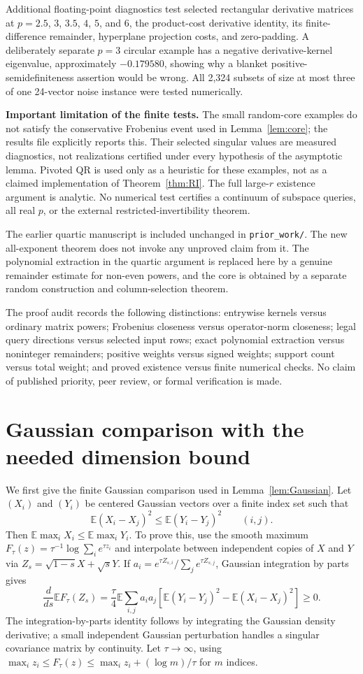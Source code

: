 \documentclass[11pt,letterpaper]{article}
\theoremstyle{definition}
\theoremstyle{remark}
\numberwithin{equation}{section}
\newcommand{\E}{\mathbb E}
\begin{document}
Additional floating-point diagnostics test selected rectangular derivative matrices at $p=2.5$, $3$, $3.5$, $4$, $5$, and $6$, the product-cost derivative identity, its finite-difference remainder, hyperplane projection costs, and zero-padding. A deliberately separate $p=3$ circular example has a negative derivative-kernel eigenvalue, approximately $-0.179580$, showing why a blanket positive-semidefiniteness assertion would be wrong. All 2,324 subsets of size at most three of one 24-vector noise instance were tested numerically.

\textbf{Important limitation of the finite tests.} The small random-core examples do not satisfy the conservative Frobenius event used in Lemma~\ref{lem:core}; the results file explicitly reports this. Their selected singular values are measured diagnostics, not realizations certified under every hypothesis of the asymptotic lemma. Pivoted QR is used only as a heuristic for these examples, not as a claimed implementation of Theorem~\ref{thm:RI}. The full large-$r$ existence argument is analytic. No numerical test certifies a continuum of subspace queries, all real $p$, or the external restricted-invertibility theorem.

The earlier quartic manuscript \cite{prior} is included unchanged in \texttt{prior\_work/}. The new all-exponent theorem does not invoke any unproved claim from it. The polynomial extraction in the quartic argument is replaced here by a genuine remainder estimate for non-even powers, and the core is obtained by a separate random construction and column-selection theorem.

The proof audit records the following distinctions: entrywise kernels versus ordinary matrix powers; Frobenius closeness versus operator-norm closeness; legal query directions versus selected input rows; exact polynomial extraction versus noninteger remainders; positive weights versus signed weights; support count versus total weight; and proved existence versus finite numerical checks. No claim of published priority, peer review, or formal verification is made.

\appendix
\section{Gaussian comparison with the needed dimension bound}\label{app:Gaussian}
We first give the finite Gaussian comparison used in Lemma~\ref{lem:Gaussian}. Let $(X_i)$ and $(Y_i)$ be centered Gaussian vectors over a finite index set such that
\[
 \E(X_i-X_j)^2\le\E(Y_i-Y_j)^2\qquad(i,j).
\]
Then $\E\max_iX_i\le\E\max_iY_i$. To prove this, use the smooth maximum
$F_\tau(z)=\tau^{-1}\log\sum_i e^{\tau z_i}$ and interpolate between independent copies of $X$ and $Y$ via $Z_s=\sqrt{1-s}X+\sqrt{s}Y$. If $a_i=e^{\tau Z_{s,i}}/\sum_je^{\tau Z_{s,j}}$, Gaussian integration by parts gives
\[
 \frac{d}{ds}\E F_\tau(Z_s)
 =\frac\tau4\E\sum_{i,j}a_ia_j
 \left[\E(Y_i-Y_j)^2-\E(X_i-X_j)^2\right]\ge0.
\]
The integration-by-parts identity follows by integrating the Gaussian density derivative; a small independent Gaussian perturbation handles a singular covariance matrix by continuity. Let $\tau\to\infty$, using
$\max_i z_i\le F_\tau(z)\le\max_i z_i+(\log m)/\tau$ for $m$ indices.
\end{document}
